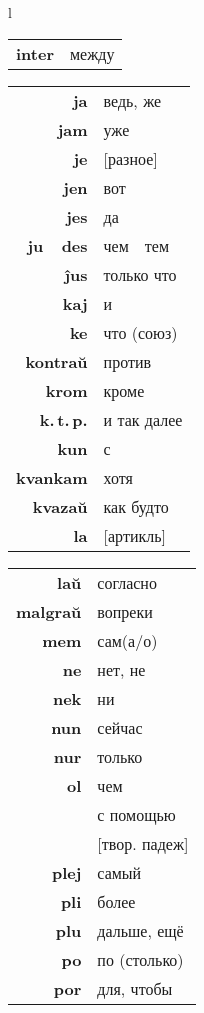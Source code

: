 \documentclass{article}
\begin{document}
\begin{center}
\begin{tabular}{l}
\begin{tabular}{>{\bfseries}rl}
inter & между \\
\end{tabular}
\hspace{-3em}
\begin{tabular}{>{\bfseries}rl}
ja & ведь, же \\
jam & уже \\
je & {}[разное] \\
jen & вот \\
jes & да \\
ju~\textellipsis~des & чем~\textellipsis~тем \\
ĵus & только что \\
kaj & и \\
ke & что (союз) \\
kontraŭ & против \\
krom & кроме \\
k.\,t.\,p. & и так далее \\
kun & с \\
kvankam & хотя \\
kvazaŭ & как будто \\
la & {}[артикль] \\
\end{tabular}
\hspace{-3em}
\begin{tabular}{>{\bfseries}rl}
laŭ & согласно \\
malgraŭ & вопреки \\
mem & сам(а/о) \\
ne & нет, не \\
nek & ни \\
nun & сейчас \\
nur & только \\
ol & чем \\
\multirow{2}{*}{per} & с помощью \\
& {}[твор. падеж] \\
plej & самый \\
pli & более \\
plu & дальше, ещё \\
po & по (столько) \\
por & для, чтобы \\

\end{tabular}
\end{tabular}
\end{center}
\end{document}
